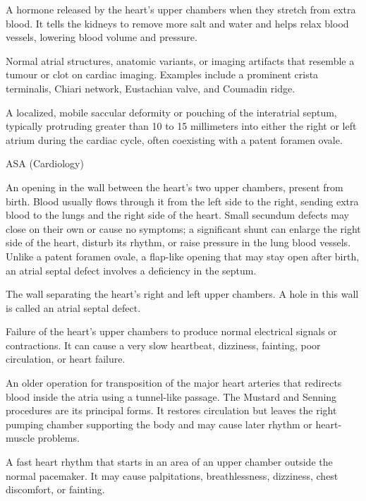  A hormone released by the heart’s upper chambers when they stretch from extra blood. It tells the kidneys to remove more salt and water and helps relax blood vessels, lowering blood volume and pressure.

 Normal atrial structures, anatomic variants, or imaging artifacts that resemble a tumour or clot on cardiac imaging. Examples include a prominent crista terminalis, Chiari network, Eustachian valve, and Coumadin ridge.

 A localized, mobile saccular deformity or pouching of the interatrial septum, typically protruding greater than 10 to 15 millimeters into either the right or left atrium during the cardiac cycle, often coexisting with a patent foramen ovale.

\synonyms
ASA (Cardiology)

 An opening in the wall between the heart’s two upper chambers, present from birth. Blood usually
flows through it from the left side to the right, sending extra blood to the lungs and the right side of the heart. Small
secundum defects may close on their own or cause no symptoms; a significant shunt can enlarge the right side of the heart,
disturb its rhythm, or raise pressure in the lung blood vessels. Unlike a patent foramen ovale, a flap-like opening that
may stay open after birth, an atrial septal defect involves a deficiency in the septum.

 The wall separating the heart’s right and left upper chambers. A hole in this wall is called an atrial septal defect.

 Failure of the heart’s upper chambers to produce normal electrical signals or contractions. It can cause a very slow heartbeat, dizziness, fainting, poor circulation, or heart failure.

 An older operation for transposition of the major heart arteries that redirects blood inside the atria using a tunnel-like passage.
The Mustard and Senning procedures are its principal forms.
It restores circulation but leaves the right pumping chamber supporting the body
and may cause later rhythm or heart-muscle problems.

 A fast heart rhythm that starts in an area of an upper chamber outside the normal pacemaker. It may cause palpitations, breathlessness, dizziness, chest discomfort, or fainting.

